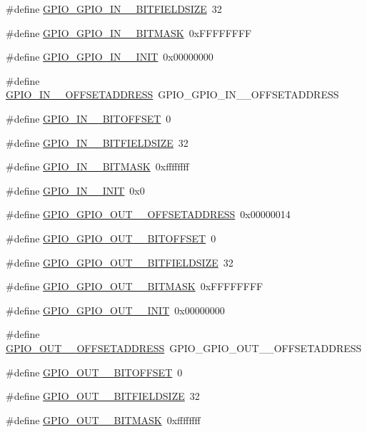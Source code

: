 \begin{DoxyCompactItemize}
\item 
\#define \hyperlink{a00553_a3a6efa6b55e3e074b139f2f821869a4a}{GPIO\_\-GPIO\_\-IN\_\_\-BITFIELDSIZE}~32
\item 
\#define \hyperlink{a00553_a0f355b00dfe232726a9096fedb31addb}{GPIO\_\-GPIO\_\-IN\_\_\-BITMASK}~0xFFFFFFFF
\item 
\#define \hyperlink{a00553_a13e2134f905d24723c1a69eac3b8e9cc}{GPIO\_\-GPIO\_\-IN\_\_\-INIT}~0x00000000
\item 
\#define \hyperlink{a00553_a9b13e393460a103b2c968d4e5bfeb75b}{GPIO\_\-IN\_\_\-OFFSETADDRESS}~GPIO\_\-GPIO\_\-IN\_\_\-OFFSETADDRESS
\item 
\#define \hyperlink{a00553_af7f4253fcc9ade6e874ec469cf6d9726}{GPIO\_\-IN\_\_\-BITOFFSET}~0
\item 
\#define \hyperlink{a00553_a3ec09a20201a35c8d628c12e5bf1fc42}{GPIO\_\-IN\_\_\-BITFIELDSIZE}~32
\item 
\#define \hyperlink{a00553_aebe6ca53d62f11ec2e44bed4ad0281a5}{GPIO\_\-IN\_\_\-BITMASK}~0xffffffff
\item 
\#define \hyperlink{a00553_abce32a9f2c9bfae4fa3bf69ff132414f}{GPIO\_\-IN\_\_\-INIT}~0x0
\item 
\#define \hyperlink{a00553_a9160d399cc553076e07c9e66fa8e87bd}{GPIO\_\-GPIO\_\-OUT\_\_\-OFFSETADDRESS}~0x00000014
\item 
\#define \hyperlink{a00553_a3d1eb9c63a47f1e2c90a827e13fa6fe7}{GPIO\_\-GPIO\_\-OUT\_\_\-BITOFFSET}~0
\item 
\#define \hyperlink{a00553_acb6b2705df01b08823554a9db0908fc7}{GPIO\_\-GPIO\_\-OUT\_\_\-BITFIELDSIZE}~32
\item 
\#define \hyperlink{a00553_a0539ed97663adaafa9a659b895676bc5}{GPIO\_\-GPIO\_\-OUT\_\_\-BITMASK}~0xFFFFFFFF
\item 
\#define \hyperlink{a00553_a1f6cd81bd739cc6ae2b05e7d41f3891c}{GPIO\_\-GPIO\_\-OUT\_\_\-INIT}~0x00000000
\item 
\#define \hyperlink{a00553_a839b7038c8d6cd465427d79a539b8813}{GPIO\_\-OUT\_\_\-OFFSETADDRESS}~GPIO\_\-GPIO\_\-OUT\_\_\-OFFSETADDRESS
\item 
\#define \hyperlink{a00553_a69e8921d792180ea973d2595554e24c3}{GPIO\_\-OUT\_\_\-BITOFFSET}~0
\item 
\#define \hyperlink{a00553_adc47237e815b1afcbc277184063c7537}{GPIO\_\-OUT\_\_\-BITFIELDSIZE}~32
\item 
\#define \hyperlink{a00553_aaed59b7cfbeab5dc70b74f345d1dece1}{GPIO\_\-OUT\_\_\-BITMASK}~0xffffffff

\end{DoxyCompactItemize}
